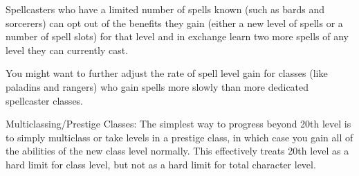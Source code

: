 Spellcasters who have a limited number of spells known (such as bards and sorcerers) can opt out of the benefits they gain (either a new level of spells or a number of spell slots) for that level and in exchange learn two more spells of any level they can currently cast.
				
You might want to further adjust the rate of spell level gain for classes (like paladins and rangers) who gain spells more slowly than more dedicated spellcaster classes.
				
Multiclassing/Prestige Classes: The simplest way to progress beyond 20th level is to simply multiclass or take levels in a prestige class, in which case you gain all of the abilities of the new class level normally. This effectively treats 20th level as a hard limit for class level, but not as a hard limit for total character level.
	      	

